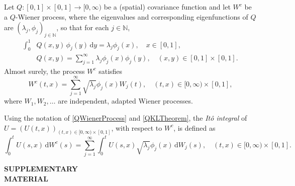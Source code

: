\documentclass[onefignum]{siamart250211}
\begin{document}
\begin{theorem}\label{QKLTheorem}Let $Q:[0,1]\times[0,1]\to[0,\infty)$ be a (spatial) covariance function and let $W^c$ be a $Q$-Wiener process, where the eigenvalues and corresponding eigenfunctions of $Q$ are $(\lambda_j,\phi_j)_{j\in\mathbb{N}}$, so that for each $j\in\mathbb{N}$,
\begin{align*}
\int_0^1&Q(x,y)\,\phi_j(y)\,\mathrm{d}y=\lambda_j\phi_j(x),\quad x\in[0,1],\\
&Q(x,y)=\sum_{j=1}^\infty\lambda_j\phi_j(x)\phi_j(y),\quad(x,y)\in[0,1]\times[0,1].
\end{align*}
Almost surely, the process $W^c$ satisfies
\begin{equation}W^c(t,x)=\sum_{j=1}^\infty\sqrt{\lambda_j}\phi_j(x)W_j(t),\quad(t,x)\in[0,\infty)\times[0,1],\label{QWienerFullExpansion}\end{equation}
where $W_1,W_2,\ldots$ are independent, adapted Wiener processes.
\end{theorem}



\begin{definition}\label{ItoIntegralofQWienerProcess}Using the notation of \cref{QWienerProcess} and \cref{QKLTheorem}, the \emph{It\^o integral} of $U=(U(t,x))_{(t,x)\in[0,\infty)\times[0,1]}$, with respect to $W^c$, is defined as
\begin{equation}\int_0^tU(s,x)\,\mathrm{d}W^c(s)=\sum_{j=1}^\infty\int_0^tU(s,x)\sqrt{\lambda_j}\phi_j(x)\,\mathrm{d}W_j(s),\quad(t,x)\in[0,\infty)\times[0,1].\label{UItoIntegral}\end{equation}
\end{definition}









\pagebreak

\begin{center}
\begin{Huge}\textbf{SUPPLEMENTARY\\MATERIAL}\end{Huge}
\end{center}
\end{document}
